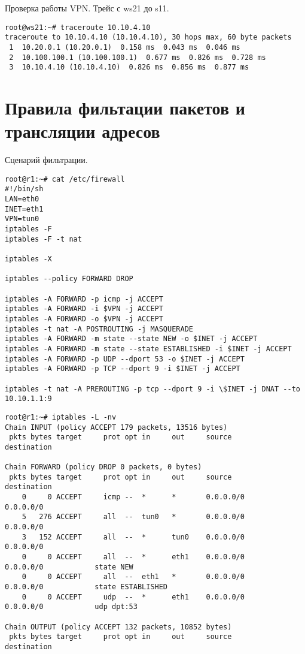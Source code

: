 \documentclass[a4paper,12pt]{article}
\begin{document}
Проверка работы VPN. Трейс с ws21 до s11.

\begin{lstlisting}
root@ws21:~# traceroute 10.10.4.10
traceroute to 10.10.4.10 (10.10.4.10), 30 hops max, 60 byte packets
 1  10.20.0.1 (10.20.0.1)  0.158 ms  0.043 ms  0.046 ms
 2  10.100.100.1 (10.100.100.1)  0.677 ms  0.826 ms  0.728 ms
 3  10.10.4.10 (10.10.4.10)  0.826 ms  0.856 ms  0.877 ms
\end{lstlisting}

\section{Правила фильтации пакетов и трансляции адресов}

Сценарий фильтрации. 

\begin{lstlisting}
root@r1:~# cat /etc/firewall 
#!/bin/sh
LAN=eth0
INET=eth1
VPN=tun0
iptables -F
iptables -F -t nat

iptables -X

iptables --policy FORWARD DROP

iptables -A FORWARD -p icmp -j ACCEPT
iptables -A FORWARD -i $VPN -j ACCEPT
iptables -A FORWARD -o $VPN -j ACCEPT
iptables -t nat -A POSTROUTING -j MASQUERADE
iptables -A FORWARD -m state --state NEW -o $INET -j ACCEPT
iptables -A FORWARD -m state --state ESTABLISHED -i $INET -j ACCEPT
iptables -A FORWARD -p UDP --dport 53 -o $INET -j ACCEPT
iptables -A FORWARD -p TCP --dport 9 -i $INET -j ACCEPT

iptables -t nat -A PREROUTING -p tcp --dport 9 -i \$INET -j DNAT --to 10.10.1.1:9
\end{lstlisting}

\begin{lstlisting}
root@r1:~# iptables -L -nv
Chain INPUT (policy ACCEPT 179 packets, 13516 bytes)
 pkts bytes target     prot opt in     out     source               destination         

Chain FORWARD (policy DROP 0 packets, 0 bytes)
 pkts bytes target     prot opt in     out     source               destination         
    0     0 ACCEPT     icmp --  *      *       0.0.0.0/0            0.0.0.0/0           
    5   276 ACCEPT     all  --  tun0   *       0.0.0.0/0            0.0.0.0/0           
    3   152 ACCEPT     all  --  *      tun0    0.0.0.0/0            0.0.0.0/0           
    0     0 ACCEPT     all  --  *      eth1    0.0.0.0/0            0.0.0.0/0            state NEW
    0     0 ACCEPT     all  --  eth1   *       0.0.0.0/0            0.0.0.0/0            state ESTABLISHED
    0     0 ACCEPT     udp  --  *      eth1    0.0.0.0/0            0.0.0.0/0            udp dpt:53

Chain OUTPUT (policy ACCEPT 132 packets, 10852 bytes)
 pkts bytes target     prot opt in     out     source               destination 
\end{lstlisting}
\end{document}
